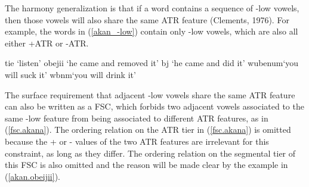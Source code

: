 \documentclass[,doc,floatsintext]{apa6}
\theoremstyle{definition}
\theoremstyle{definition}
\theoremstyle{definition}
\theoremstyle{remark}
\begin{document}
The harmony generalization is that if a word contains a sequence of -low
vowels, then those vowels will also share the same ATR feature
(Clements, 1976). For example, the words in (\ref{akan_-low}) contain
only -low vowels, which are also all either +ATR or -ATR.

\begin{exe}
\label{akan_-low}
\begin{xlist}
  \ex tie `listen'
  \ex obejii `he came and removed it'
  \ex {}bj  `he came and did it'
  \ex wubenum\textraiseglotstop `you will suck it'
  \ex wbnm\textraiseglotstop `you will drink it'
  \end{xlist}
\end{exe}

The surface requirement that adjacent -low vowels share the same ATR
feature can also be written as a FSC, which forbids two adjacent vowels
associated to the same -low feature from being associated to different
ATR features, as in (\ref{fsc.akana}). The ordering relation on the ATR
tier in (\ref{fsc.akana}) is omitted because the + or - values of the
two ATR features are irrelevant for this constraint, as long as they
differ. The ordering relation on the segmental tier of this FSC is also
omitted and the reason will be made clear by the example in
(\ref{akan.obeijii}).

\begin{exe}
\ex \label{fsc.akana}
\end{exe}
\end{document}
